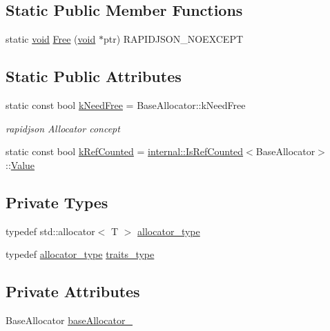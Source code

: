 \subsection*{Static Public Member Functions}
\begin{DoxyCompactItemize}
\item 
static \hyperlink{imgui__impl__opengl3__loader_8h_ac668e7cffd9e2e9cfee428b9b2f34fa7}{void} \hyperlink{classStdAllocator_ae3b6918eee229eeb89e9535d65296d6d}{Free} (\hyperlink{imgui__impl__opengl3__loader_8h_ac668e7cffd9e2e9cfee428b9b2f34fa7}{void} $\ast$ptr) R\+A\+P\+I\+D\+J\+S\+O\+N\+\_\+\+N\+O\+E\+X\+C\+E\+PT
\end{DoxyCompactItemize}
\subsection*{Static Public Attributes}
\begin{DoxyCompactItemize}
\item 
static const bool \hyperlink{classStdAllocator_a75b2c8e2995e564037dd7d5408217a6b}{k\+Need\+Free} = Base\+Allocator\+::k\+Need\+Free
\begin{DoxyCompactList}\small\item\em rapidjson Allocator concept \end{DoxyCompactList}\item 
static const bool \hyperlink{classStdAllocator_afd2564e7c3121474d93c805839fa5f83}{k\+Ref\+Counted} = \hyperlink{structinternal_1_1IsRefCounted}{internal\+::\+Is\+Ref\+Counted}$<$Base\+Allocator$>$\+::\hyperlink{document_8h_a071cf97155ba72ac9a1fc4ad7e63d481}{Value}
\end{DoxyCompactItemize}
\subsection*{Private Types}
\begin{DoxyCompactItemize}
\item 
typedef std\+::allocator$<$ T $>$ \hyperlink{classStdAllocator_a572b0281d5b161135a426d3ff348d997}{allocator\+\_\+type}
\item 
typedef \hyperlink{classStdAllocator_a572b0281d5b161135a426d3ff348d997}{allocator\+\_\+type} \hyperlink{classStdAllocator_a5cc8d5905b0333753db9d7437aeadfc0}{traits\+\_\+type}
\end{DoxyCompactItemize}
\subsection*{Private Attributes}
\begin{DoxyCompactItemize}
\item 
Base\+Allocator \hyperlink{classStdAllocator_a66c60fe437ac39440d37410884dd18be}{base\+Allocator\+\_\+}
\end{DoxyCompactItemize}
